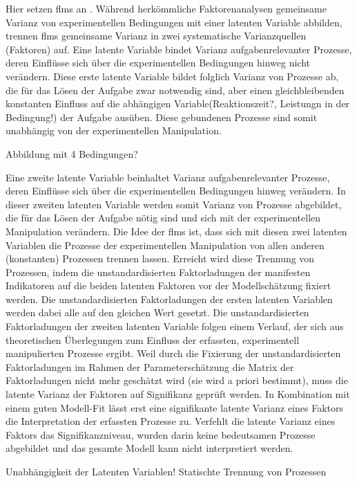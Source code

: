 \documentclass[11pt, twoside, a4paper]{book}		%
\begin{document}
Hier setzen \glspl{flm} an \citep{Schweizer2006a, Schweizer2006b}. Während herkömmliche Faktorenanalysen gemeinsame Varianz von experimentellen Bedingungen mit einer latenten Variable abbilden, trennen \glspl{flm} gemeinsame Varianz in zwei systematische Varianzquellen (Faktoren) auf. 
Eine latente Variable bindet Varianz aufgabenrelevanter Prozesse, deren Einflüsse sich über die experimentellen Bedingungen hinweg nicht verändern. Diese erste latente Variable bildet folglich Varianz von Prozesse ab, die für das Lösen der Aufgabe zwar notwendig sind, aber einen gleichbleibenden konstanten Einfluss auf die abhängigen Variable(Reaktionszeit?, Leistungn in der Bedingung!)  der Aufgabe ausüben. Diese gebundenen Prozesse sind somit unabhängig von der experimentellen Manipulation.

Abbildung mit 4 Bedingungen?

Eine zweite latente Variable beinhaltet Varianz aufgabenrelevanter Prozesse, deren Einflüsse sich über die experimentellen Bedingungen hinweg verändern. In dieser zweiten latenten Variable werden somit Varianz von Prozesse abgebildet, die für das Lösen der Aufgabe nötig sind und sich mit der experimentellen Manipulation verändern. Die Idee der \glspl{flm} ist, dass sich mit diesen zwei latenten Variablen die Prozesse der experimentellen Manipulation von allen anderen (konstanten) Prozessen trennen lassen.
Erreicht wird diese Trennung von Prozessen, indem die unstandardisierten Faktorladungen der manifesten Indikatoren auf die beiden latenten Faktoren vor der Modellschätzung fixiert werden. Die unstandardisierten Faktorladungen der ersten latenten Variablen werden dabei alle auf den gleichen Wert gesetzt. Die unstandardisierten Faktorladungen der zweiten latenten Variable folgen einem Verlauf, der sich aus theoretischen Überlegungen zum Einfluss der erfassten, experimentell manipulierten Prozesse ergibt. 
Weil durch die Fixierung der unstandardisierten Faktorladungen im Rahmen der Parameterschätzung die Matrix der Faktorladungen nicht mehr geschätzt wird (sie wird a priori bestimmt), muss die latente Varianz der Faktoren auf Signifikanz geprüft werden. In Kombination mit einem guten Modell-Fit lässt erst eine signifikante latente Varianz eines Faktors die Interpretation der erfassten Prozesse zu. Verfehlt die latente Varianz eines Faktors das Signifikanzniveau, wurden darin keine bedeutsamen Prozesse abgebildet und das gesamte Modell kann nicht interpretiert werden.

Unabhängigkeit der Latenten Variablen!
Statischte Trennung von Prozessen
\end{document}
